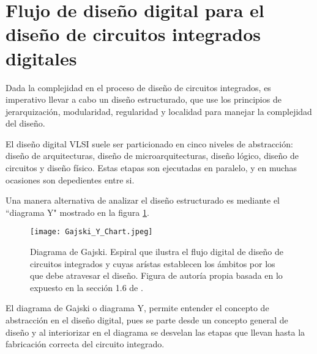 \section{Flujo de diseño digital para el diseño de circuitos integrados digitales}

Dada la complejidad en el proceso de diseño de circuitos integrados, es imperativo llevar a cabo un diseño estructurado, que use los principios de jerarquización, modularidad, regularidad y localidad para manejar la complejidad del diseño.

El diseño digital VLSI suele ser particionado en cinco niveles de abstracción: diseño de arquitecturas, diseño de microarquitecturas, diseño lógico, diseño de circuitos y diseño físico. Estas etapas son ejecutadas en paralelo, y en muchas ocasiones son depedientes entre si.

Una manera alternativa de analizar el diseño estructurado es mediante el ``diagrama Y" mostrado en la figura \ref{Ychart}. 

\begin{figure}[h]
\texttt{[image: Gajski\_Y\_Chart.jpeg]}
\centering
\caption{Diagrama de Gajski. Espiral que ilustra el flujo digital de diseño de circuitos integrados y cuyas arístas establecen los ámbitos por los que debe atravesar el diseño. Figura de autoría propia basada en lo expuesto en la sección 1.6 de \cite{book:weste2005}.}
\label{Ychart}
\end{figure}


El diagrama de Gajski o diagrama Y, permite entender el concepto de abstracción en el diseño digital, pues se parte desde un concepto general de diseño y al interiorizar en el diagrama se desvelan las etapas que llevan hasta la fabricación correcta del circuito integrado.


